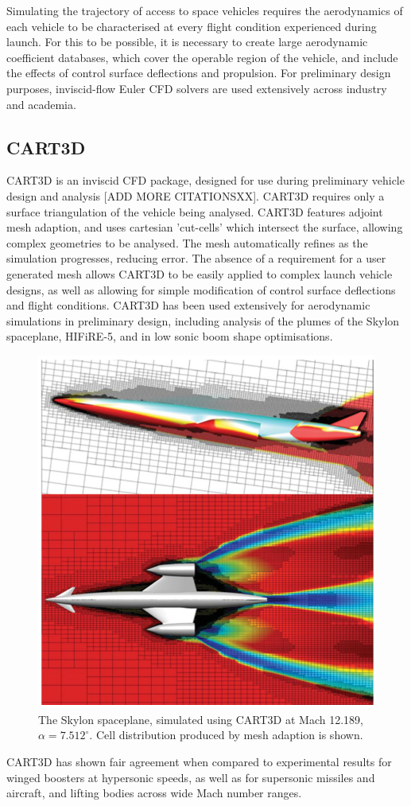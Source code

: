 Simulating the trajectory of access to space vehicles requires the aerodynamics of each vehicle to be characterised at every flight condition experienced during launch. For this to be possible, it is necessary to create large aerodynamic coefficient databases, which cover the operable region of the vehicle, and include the effects of control surface deflections and propulsion.
For preliminary design purposes, inviscid-flow Euler CFD solvers are used extensively across industry and academia\cite{Almosnino2016}. 


\subsection{CART3D}

CART3D is an inviscid CFD package, designed for use during preliminary vehicle design and analysis [ADD MORE CITATIONSXX]\cite{Almosnino2016}. CART3D requires only a surface triangulation of the vehicle being analysed. CART3D features adjoint mesh adaption, and uses cartesian 'cut-cells' which intersect the surface, allowing complex geometries to be analysed. The mesh automatically refines as the simulation progresses, reducing error. The absence of a requirement for a user generated mesh allows CART3D to be easily applied to complex launch vehicle designs, as well as allowing for simple modification of control surface deflections and flight conditions. 
CART3D has been used extensively for aerodynamic simulations in preliminary design, including analysis of the plumes of the Skylon spaceplane\cite{Mehta2016}, HIFiRE-5\cite{Kimmel2010}, and in low sonic boom shape optimisations\cite{Aftosmis2011}. 
\begin{figure}
\centering
\includegraphics[width=0.6\linewidth]{figures/2_literature-review/Skylon-CART3D}
\caption{The Skylon spaceplane, simulated using CART3D at Mach 12.189, $\alpha=7.512^\circ$\cite{Mehta2016}. Cell distribution produced by mesh adaption is shown.}
\label{fig:Skylon-CART3D}
\end{figure}
CART3D has shown fair agreement when compared to experimental results for winged boosters at hypersonic speeds\cite{Sagerman2017}, as well as for supersonic missiles\cite{Abeynayake} and aircraft\cite{Aftosmis2011}, and lifting bodies across wide Mach number ranges\cite{Almosnino2016a}.



